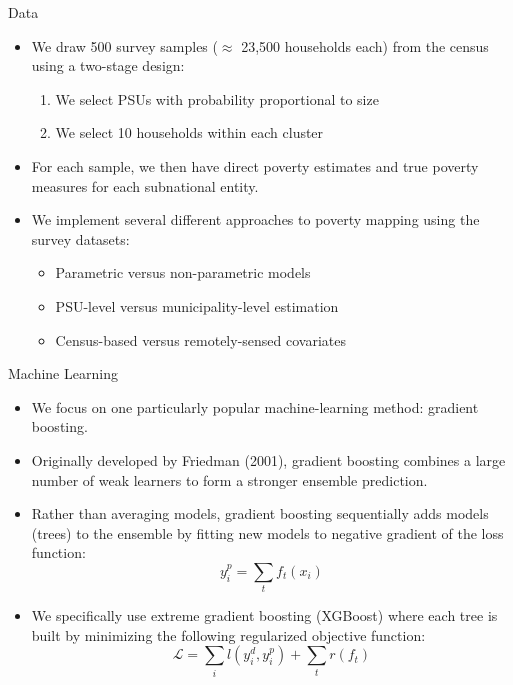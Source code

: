 \documentclass[aspectratio=169, xcolor=dvipsnames]{beamer}
\begin{document}
\begin{frame}{Data}
\begin{itemize}
\item We draw 500 survey samples ($\approx$ 23,500 households each) from the 
census using a two-stage design:
\begin{enumerate}
\item We select PSUs with probability proportional to size
\item We select 10 households within each cluster
\end{enumerate}
\par\pause\noindent
\item For each sample, we then have direct poverty estimates and 
true poverty measures for each subnational entity.
\par\pause\noindent
\item We implement several different approaches to poverty mapping using the 
survey datasets:
\begin{itemize}
\item Parametric versus non-parametric models
\item PSU-level versus municipality-level estimation
\item Census-based versus remotely-sensed covariates
\end{itemize}
\end{itemize}
\end{frame}

\begin{frame}{Machine Learning}
\begin{itemize}
\item We focus on one particularly popular machine-learning method: gradient 
boosting.
\par\pause\noindent
\item Originally developed by Friedman (2001), gradient boosting combines a 
large number of weak learners to form a stronger ensemble prediction.
\par\pause\noindent
\item Rather than averaging models, gradient boosting sequentially adds models 
(trees) to the ensemble by fitting new models to negative gradient of the loss function:
\begin{equation*}
y_i^p = \sum_t f_t(x_i)
\end{equation*}
\par\pause\noindent
\item We specifically use extreme gradient boosting (XGBoost) where each tree
is built by minimizing the following regularized objective function: 
\begin{equation*}
\mathcal{L} = \sum_i l(y_i^d, y_i^p) + \sum_t r(f_t)
\end{equation*}
\end{itemize}
\end{frame}
\end{document}
